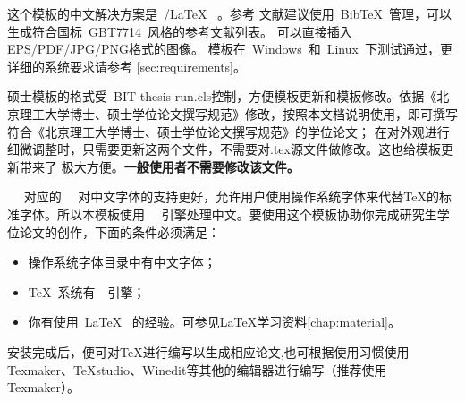 这个模板的中文解决方案是~\XeTeX/\LaTeX~ 。参考
文献建议使用~BibTeX~管理，可以生成符合国标~GBT7714~风格的参考文献列表。
可以直接插入EPS/PDF/JPG/PNG格式的图像。
模板在~Windows~和~Linux~下测试通过，更详细的系统要求请参考
\ref{sec:requirements}。

硕士模板的格式受~BIT-thesis-run.cls控制，方便模板更新和模板修改。依据《北京理工大学博士、硕士学位论文撰写规范》修改，按照本文档说明使用，即可撰写符合《北京理工大学博士、硕士学位论文撰写规范》的学位论文；
在对外观进行细微调整时，只需要更新这两个文件，不需要对.tex源文件做修改。这也给模板更新带来了
极大方便。\textbf{一般使用者不需要修改该文件。}
 
~\XeLaTeX~ 对应的~\XeTeX~ 对中文字体的支持更好，允许用户使用操作系统字体来代替TeX的标准字体。所以本模板使用~\XeLaTeX~ 引擎处理中文。要使用这个模板协助你完成研究生学位论文的创作，下面的条件必须满足：

\begin{itemize}
\item  操作系统字体目录中有中文字体；
\item  \TeX~系统有~\XeTeX~引擎；
\item  你有使用~\LaTeX~ 的经验。可参见LaTeX学习资料\ref{chap:material}。
\end{itemize}

安装完成后，便可对\TeX 进行编写以生成相应论文,也可根据使用习惯使用Texmaker、TeXstudio、Winedit等其他的编辑器进行编写（推荐使用Texmaker）。



